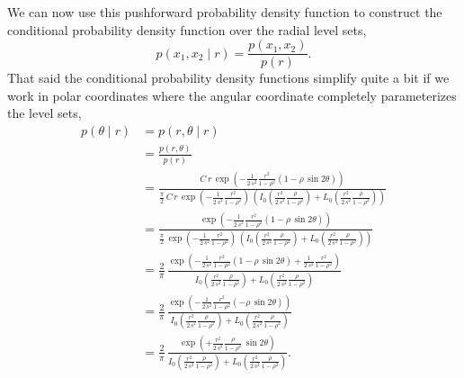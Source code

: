 \documentclass[
  letterpaper,
  DIV=11,
  numbers=noendperiod]{scrartcl}
\begin{document}
We can now use this pushforward probability density function to
construct the conditional probability density function over the radial
level sets, \[
p(x_{1}, x_{2} \mid r) = \frac{ p(x_{1}, x_{2}) }{ p(r) }.
\] That said the conditional probability density functions simplify
quite a bit if we work in polar coordinates where the angular coordinate
completely parameterizes the level sets, \begin{align*}
p(\theta \mid r)
&=
p(r, \theta \mid r)
\\
&=
\frac{ p(r, \theta) }{ p(r) }
\\
&=
\frac{
C \, r \, \exp \left( - \frac{1}{2 \, s^{2}} \frac{r^{2}}{1 - \rho^{2}}
( 1 - \rho \, \sin 2 \theta) \right)
}{
\frac{\pi}{2} \, C \, r \,
\exp \left( - \frac{1}{2 \, s^{2}} \frac{r^{2}}{1 - \rho^{2}} \right) \,
\left(
  I_{0} \left( \frac{r^{2}}{2 \, s^{2}} \frac{\rho}{1 - \rho^{2}} \right)
+ L_{0} \left( \frac{r^{2}}{2 \, s^{2}} \frac{\rho}{1 - \rho^{2}} \right)
\right)
}
\\
&=
\frac{
\exp \left( - \frac{1}{2 \, s^{2}} \frac{r^{2}}{1 - \rho^{2}}
( 1 - \rho \, \sin 2 \theta) \right)
}{
\frac{\pi}{2} \,
\exp \left( - \frac{1}{2 \, s^{2}} \frac{r^{2}}{1 - \rho^{2}} \right) \,
\left(
  I_{0} \left( \frac{r^{2}}{2 \, s^{2}} \frac{\rho}{1 - \rho^{2}} \right)
+ L_{0} \left( \frac{r^{2}}{2 \, s^{2}} \frac{\rho}{1 - \rho^{2}} \right)
\right)
}
\\
&=
\frac{2}{\pi} \,
\frac{
\exp \left( - \frac{1}{2 \, s^{2}} \frac{r^{2}}{1 - \rho^{2}}
              ( 1 - \rho \, \sin 2 \theta)
            + \frac{1}{2 \, s^{2}} \frac{r^{2}}{1 - \rho^{2}} \right)
}{
  I_{0} \left( \frac{r^{2}}{2 \, s^{2}} \frac{\rho}{1 - \rho^{2}} \right)
+ L_{0} \left( \frac{r^{2}}{2 \, s^{2}} \frac{\rho}{1 - \rho^{2}} \right)
}
\\
&=
\frac{2}{\pi} \,
\frac{
\exp \left( - \frac{1}{2 \, s^{2}} \frac{r^{2}}{1 - \rho^{2}}
(- \rho \, \sin 2 \theta) \right)
}{
  I_{0} \left( \frac{r^{2}}{2 \, s^{2}} \frac{\rho}{1 - \rho^{2}} \right)
+ L_{0} \left( \frac{r^{2}}{2 \, s^{2}} \frac{\rho}{1 - \rho^{2}} \right)
}
\\
&=
\frac{2}{\pi} \,
\frac{
\exp \left( + \frac{r^{2}}{2 \, s^{2}} \frac{\rho}{1 - \rho^{2}} \,
              \sin 2 \theta \right)
}{
  I_{0} \left( \frac{r^{2}}{2 \, s^{2}} \frac{\rho}{1 - \rho^{2}} \right)
+ L_{0} \left( \frac{r^{2}}{2 \, s^{2}} \frac{\rho}{1 - \rho^{2}} \right)
}.
\end{align*}
\end{document}
